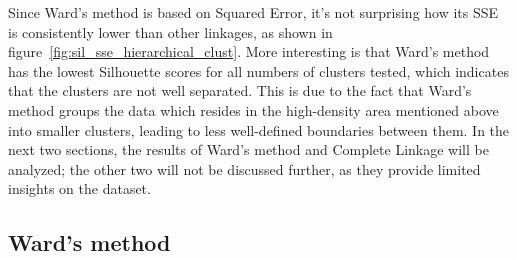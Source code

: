 Since Ward's method is based on Squared Error, it's not surprising how its SSE is consistently lower than other linkages, as shown in figure~\ref{fig:sil_sse_hierarchical_clust}.
More interesting is that Ward's method has the lowest Silhouette scores for all numbers
of clusters tested, which indicates that the clusters are not well separated. This is due to
the fact that Ward's method groups the data which resides in the high-density area
mentioned above into smaller clusters, leading to less well-defined boundaries between them.
In the next two sections, the results of Ward's method and Complete Linkage will be analyzed;
the other two will not be discussed further, as they provide limited insights on the dataset.

\subsection{Ward's method}

